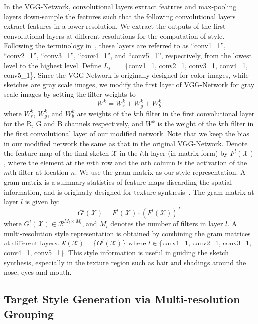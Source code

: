 \documentclass[10pt,twocolumn,letterpaper]{article}
\begin{document}
In the VGG-Network, convolutional layers extract features and max-pooling layers down-sample the features such that the following convolutional layers extract features in a lower resolution. We extract the outputs of the first convolutional layers at different resolutions for the computation of style. Following the terminology in~\cite{gatys2015texture}, these layers are referred to as ``conv1\_1'', ``conv2\_1'', ``conv3\_1'', ``conv4\_1'', and ``conv5\_1'', respectively, from the lowest level to the highest level. Define $L_s$ $=$ \{conv1\_1, conv2\_1, conv3\_1, conv4\_1, conv5\_1\}. Since the VGG-Network is originally designed for color images, while sketches are gray scale images, we modify the first layer of VGG-Network for gray scale images by setting the filter weights to
\begin{equation}
W^{k} = W^{k}_r+W^{k}_g+W^{k}_b
\label{eq:VGG_weights}
\end{equation}
where $W^{k}_r$, $W^{k}_g$, and $W^{k}_b$ are weights of the $k$th filter in the first convolutional layer for the R, G and B channels respectively, and $W^{k}$ is the weight of the $k$th filter in the first convolutional layer of our modified network. Note that we keep the bias in our modified network the same as that in the original VGG-Network. Denote the feature map of the final sketch $\mathcal{X}$ in the $l$th layer (in matrix form) by $F^{l}\left(\mathcal{X}\right)$, where the element at the $m$th row and the $n$th column is the activation of the $m$th filter at location $n$. We use the gram matrix as our style representation. A gram matrix is a summary statistics of feature maps discarding the spatial information, and  is originally designed for texture synthesis~\cite{gatys2015texture}. The gram matrix at layer $l$ is given by:
\begin{equation}
G^l\left(\mathcal{X}\right) = {F^l\left(\mathcal{X}\right)} \cdot {\left( {{F^l\left(\mathcal{X}\right)}} \right)^T}
\label{eq:Gram_element}
\end{equation}
where ${G^l\left(\mathcal{X}\right)} \in {\mathcal{R}^{{M_l} \times {M_l}}}$, and $M_l$ denotes the number of filters in layer $l$. A multi-resolution style representation is obtained by combining the gram matrices at different layers: $\mathcal{S}\left(\mathcal{X}\right)=$\{$G^l \left(\mathcal{X}\right)$\} where $l\in$\{conv1\_1, conv2\_1, conv3\_1, conv4\_1, conv5\_1\}. This style information is useful in guiding the sketch synthesis, especially in the texture region such as hair and shadings around the nose, eyes and mouth. 
{
\subsection{Target Style Generation via Multi-resolution Grouping}
}
\end{document}
